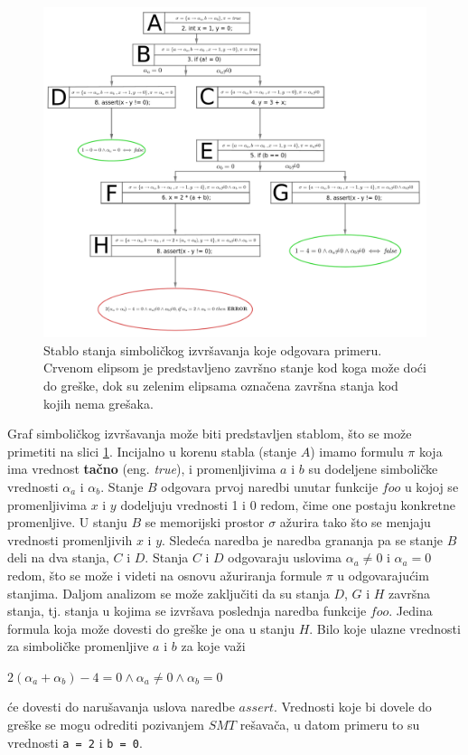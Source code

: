 \documentclass[12pt,oneside]{memoir}
\begin{document}
\begin{figure}[ht]
    \centering
    \includegraphics[width=1.0\linewidth]{osnovni_primer.png}
    \caption{Stablo stanja simboličkog izvršavanja koje odgovara primeru. Crvenom elipsom je predstavljeno završno stanje kod koga može doći do greške, dok su zelenim elipsama označena završna stanja kod kojih nema grešaka.}
    \label{fig:osnovni_primer}
\end{figure}

Graf simboličkog izvršavanja može biti predstavljen stablom, što se može primetiti na slici \ref{fig:osnovni_primer}. Incijalno u korenu stabla (stanje $A$) imamo formulu $\pi$ koja ima vrednost \textbf{tačno} (eng. \textit{true}), i promenljivima $a$ i $b$ su dodeljene simboličke vrednosti $\alpha_a$ i $\alpha_b$. Stanje $B$ odgovara prvoj naredbi unutar funkcije $foo$ u kojoj se promenljivima $x$ i $y$ dodeljuju vrednosti 1 i 0 redom, čime one postaju konkretne promenljive. U stanju $B$ se memorijski prostor $\sigma$ ažurira tako što se menjaju vrednosti promenljivih $x$ i $y$. Sledeća naredba je naredba grananja pa se stanje $B$ deli na dva stanja, $C$ i $D$. Stanja $C$ i $D$ odgovaraju uslovima $\alpha_a \neq 0$ i $\alpha_a = 0$ redom, što se može i videti na osnovu ažuriranja formule $\pi$ u odgovarajućim stanjima. Daljom analizom se može zaključiti da su stanja $D$, $G$ i $H$ završna stanja, tj. stanja u kojima se izvršava poslednja naredba funkcije $foo$. Jedina formula koja može dovesti do greške je ona u stanju $H$. Bilo koje ulazne vrednosti za simboličke promenljive $a$ i $b$ za koje važi
\vskip 0.2in
\centerline{$2(\alpha_a + \alpha_b) - 4 = 0 \land \alpha_a \neq 0 \land \alpha_b = 0$}
\vskip 0.2in
\noindent će dovesti do narušavanja uslova naredbe $assert$. Vrednosti koje bi dovele do greške se mogu odrediti pozivanjem $SMT$ rešavača, u datom primeru to su vrednosti \texttt{a = 2} i \texttt{b = 0}.
\end{document}
